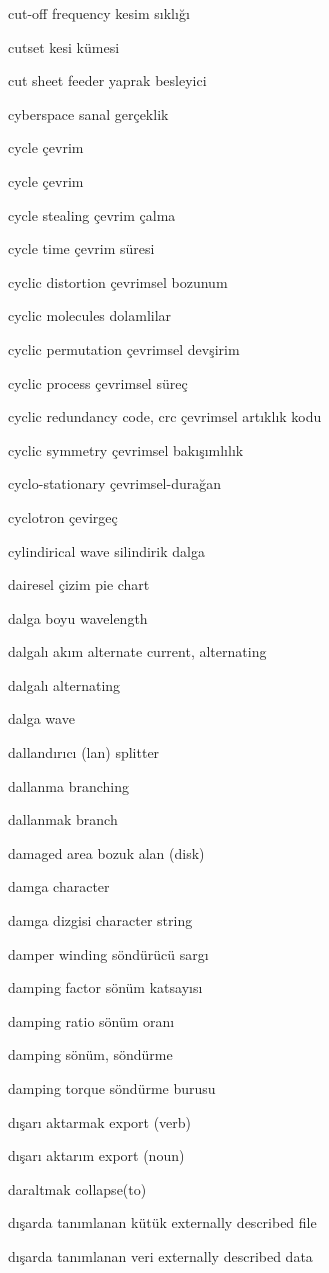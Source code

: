\documentclass[12pt,fleqn]{article}\usepackage{../../common}
\begin{document}
cut-off frequency kesim sıklığı

cutset kesi kümesi

cut sheet feeder yaprak besleyici

cyberspace sanal gerçeklik

cycle çevrim

cycle çevrim

cycle stealing çevrim çalma

cycle time çevrim süresi

cyclic distortion çevrimsel bozunum

cyclic molecules dolamlilar

cyclic permutation çevrimsel devşirim

cyclic process çevrimsel süreç

cyclic redundancy code, crc çevrimsel artıklık kodu

cyclic symmetry çevrimsel bakışımlılık

cyclo-stationary çevrimsel-durağan

cyclotron çevirgeç

cylindirical wave silindirik dalga

dairesel çizim pie chart

dalga boyu wavelength

dalgalı akım alternate current, alternating

dalgalı alternating

dalga wave

dallandırıcı (lan) splitter

dallanma branching

dallanmak branch

damaged area bozuk alan (disk)

damga character

damga dizgisi character string

damper winding söndürücü sargı

damping factor sönüm katsayısı

damping ratio sönüm oranı

damping sönüm, söndürme

damping torque söndürme burusu

dışarı aktarmak export (verb)

dışarı aktarım export (noun)

daraltmak collapse(to)

dışarda tanımlanan kütük externally described file

dışarda tanımlanan veri externally described data
\end{document}
